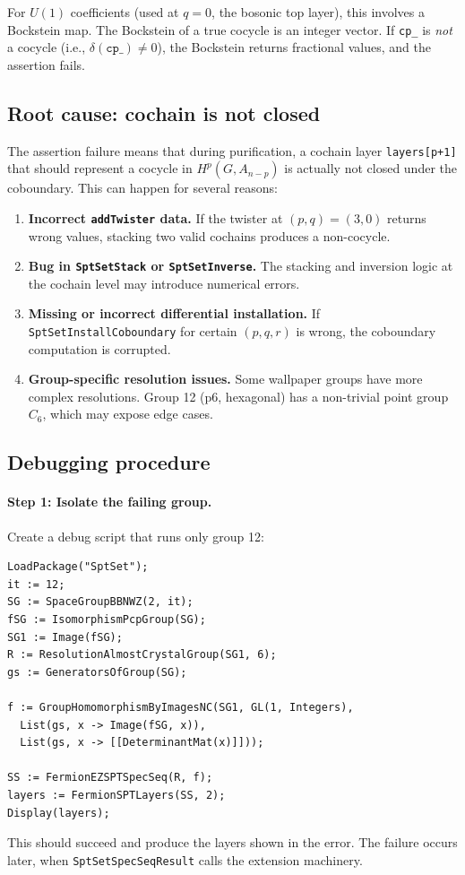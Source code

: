 \documentclass{SciPost}
\begin{document}
For $U(1)$ coefficients (used at $q=0$, the bosonic top layer), this involves a Bockstein map.
The Bockstein of a true cocycle is an integer vector.
If \texttt{cp\_} is \emph{not} a cocycle (i.e., $\delta(\texttt{cp\_}) \neq 0$), the Bockstein returns fractional values, and the assertion fails.

\subsection{Root cause: cochain is not closed}

The assertion failure means that during purification, a cochain layer \texttt{layers[p+1]} that should represent a cocycle in $H^p(G, A_{n-p})$ is actually not closed under the coboundary.
This can happen for several reasons:
\begin{enumerate}
    \item \textbf{Incorrect \texttt{addTwister} data.}
    If the twister at $(p,q)=(3,0)$ returns wrong values, stacking two valid cochains produces a non-cocycle.
    \item \textbf{Bug in \texttt{SptSetStack} or \texttt{SptSetInverse}.}
    The stacking and inversion logic at the cochain level may introduce numerical errors.
    \item \textbf{Missing or incorrect differential installation.}
    If \texttt{SptSetInstallCoboundary} for certain $(p,q,r)$ is wrong, the coboundary computation is corrupted.
    \item \textbf{Group-specific resolution issues.}
    Some wallpaper groups have more complex resolutions.
    Group 12 (p6, hexagonal) has a non-trivial point group $C_6$, which may expose edge cases.
\end{enumerate}

\subsection{Debugging procedure}

\paragraph{Step 1: Isolate the failing group.}
Create a debug script that runs only group 12:
\begin{verbatim}
LoadPackage("SptSet");
it := 12;
SG := SpaceGroupBBNWZ(2, it);
fSG := IsomorphismPcpGroup(SG);
SG1 := Image(fSG);
R := ResolutionAlmostCrystalGroup(SG1, 6);
gs := GeneratorsOfGroup(SG);

f := GroupHomomorphismByImagesNC(SG1, GL(1, Integers),
  List(gs, x -> Image(fSG, x)),
  List(gs, x -> [[DeterminantMat(x)]]));

SS := FermionEZSPTSpecSeq(R, f);
layers := FermionSPTLayers(SS, 2);
Display(layers);
\end{verbatim}
This should succeed and produce the layers shown in the error.
The failure occurs later, when \texttt{SptSetSpecSeqResult} calls the extension machinery.
\end{document}
